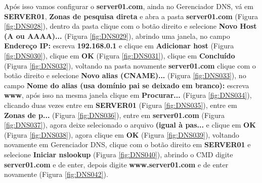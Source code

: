 \documentclass[10pt]{article}
\begin{document}
\par Após isso vamos configurar o \textbf{server01.com}, ainda no Gerenciador DNS, vá em \textbf{SERVER01}, \textbf{Zonas de pesquisa direta} e abra a pasta \textbf{server01.com} (Figura \ref{fig:DNS028}), dentro da pasta clique com o botão direito e selecione \textbf{Novo Host (A ou AAAA)...} (Figura \ref{fig:DNS029}), abrindo uma janela, no campo \textbf{Endereço IP:} escreva \textbf{192.168.0.1} e clique em \textbf{Adicionar host} (Figura \ref{fig:DNS030}), clique em \textbf{OK} (Figura \ref{fig:DNS031}), clique em \textbf{Concluído} (Figura \ref{fig:DNS032}), voltando na pasta novamente \textbf{server01.com} clique com o botão direito e selecione \textbf{Novo alias (CNAME)...} (Figura \ref{fig:DNS033}), no campo \textbf{Nome do alias (usa domínio pai se deixado em branco):} escreva \textbf{www}, após isso na mesma janela clique em \textbf{Procurar...} (Figura \ref{fig:DNS034}), clicando duas vezes entre em \textbf{SERVER01} (Figura \ref{fig:DNS035}), entre em \textbf{Zonas de p...} (Figura \ref{fig:DNS036}), entre em \textbf{server01.com} (Figura \ref{fig:DNS037}), agora deixe selecionado o arquivo \textbf{(igual à pas...} e clique em \textbf{OK} (Figura \ref{fig:DNS038}), agora clique em \textbf{OK} (Figura \ref{fig:DNS039}), voltando novamente em Gerenciador DNS, clique com o botão direito em \textbf{SERVER01} e selecione \textbf{Iniciar nslookup} (Figura \ref{fig:DNS040}), abrindo o CMD digite \textbf{server01.com} e de enter, depois digite \textbf{www.server01.com} e de enter novamente (Figura \ref{fig:DNS042}).
\end{document}
